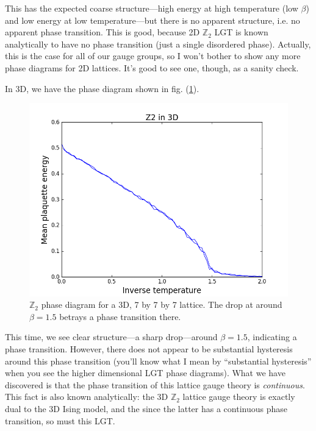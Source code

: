 \documentclass[9pt,twocolumn,twoside]{article}
\begin{document}
This has the expected coarse structure---high energy at high temperature (low $\beta$) and low energy at low temperature---but there is no apparent structure, i.e. no apparent phase transition.  This is good, because 2D $\mathbb{Z}_2$ LGT is known analytically to have no phase transition (just a single disordered phase).  Actually, this is the case for all of our gauge groups, so I won't bother to show any more phase diagrams for 2D lattices.  It's good to see one, though, as a sanity check.  

In 3D, we have the phase diagram shown in fig. (\ref{z2,3d}).
\begin{figure}[h!]
	\begin{centering}
	\includegraphics[width=\columnwidth]{z2,3d}
	\caption[$\mathbb{Z}_2$ lattice gauge theory phase diagram for a 3D lattice.]{$\mathbb{Z}_2$ phase diagram for a 3D, 7 by 7 by 7 lattice.  The drop at around $\beta=1.5$ betrays a phase transition there.}
	\label{z2,3d}
	\end{centering}
\end{figure}
This time, we see clear structure---a sharp drop---around $\beta=1.5$, indicating a phase transition.  However, there does not appear to be substantial hysteresis around this phase transition (you'll know what I mean by ``substantial hysteresis'' when you see the higher dimensional LGT phase diagrams).  What we have discovered is that the phase transition of this lattice gauge theory is \textit{continuous}.  This fact is also known analytically: the 3D $\mathbb{Z}_2$ lattice gauge theory is exactly dual to the 3D Ising model, and the since the latter has a continuous phase transition, so must this LGT.
\end{document}

